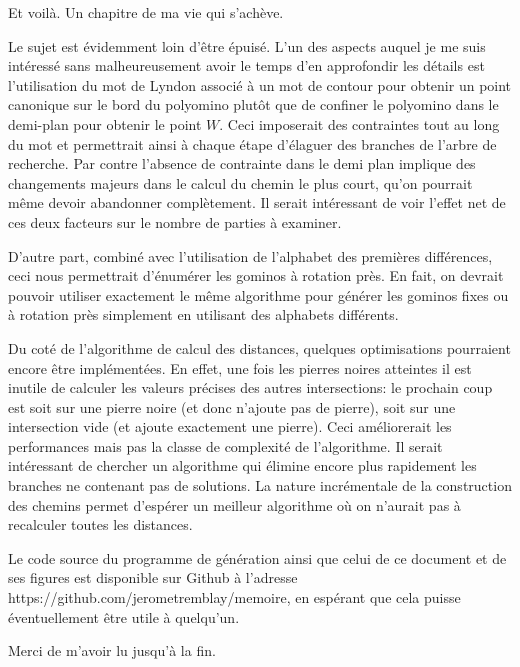 
\begin{conclusion}
Et voilà. Un chapitre de ma vie qui s'achève.

Le sujet est évidemment loin d'être épuisé. L'un des aspects auquel je me suis intéressé sans malheureusement avoir le temps d'en approfondir les détails est l'utilisation du mot de Lyndon associé à un mot de contour pour obtenir un point canonique sur le bord du polyomino plutôt que de confiner le polyomino dans le demi-plan pour obtenir le point $W$. Ceci imposerait des contraintes tout au long du mot et permettrait ainsi à chaque étape d'élaguer des branches de l'arbre de recherche. Par contre l'absence de contrainte dans le demi plan implique des changements majeurs dans le calcul du chemin le plus court, qu'on pourrait même devoir abandonner complètement. Il serait intéressant de voir l'effet net de ces deux facteurs sur le nombre de parties à examiner.

D'autre part, combiné avec l'utilisation de l'alphabet des premières différences, ceci nous permettrait d'énumérer les gominos à rotation près. En fait, on devrait pouvoir utiliser exactement le même algorithme pour générer les gominos fixes ou à rotation près simplement en utilisant des alphabets différents. 

Du coté de l'algorithme de calcul des distances, quelques optimisations pourraient encore être implémentées. En effet, une fois les pierres noires atteintes il est inutile de calculer les valeurs précises des autres intersections: le prochain coup est soit sur une pierre noire (et donc n'ajoute pas de pierre), soit sur une intersection vide (et ajoute exactement une pierre). Ceci améliorerait les performances mais pas la classe de complexité de l'algorithme. Il serait intéressant de chercher un algorithme qui élimine encore plus rapidement les branches ne contenant pas de solutions. La nature incrémentale de la construction des chemins permet d'espérer un meilleur algorithme où on n'aurait pas à recalculer toutes les distances.

Le code source du programme de génération ainsi que celui de ce document et de ses figures est disponible sur Github à l'adresse https://github.com/jerometremblay/memoire, en espérant que cela puisse éventuellement être utile à quelqu'un.

Merci de m'avoir lu jusqu'à la fin.
\end{conclusion}
